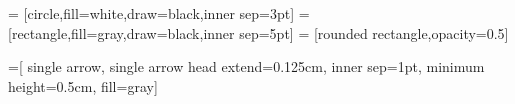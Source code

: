 \usetikzlibrary{shapes}
\usetikzlibrary{arrows}
\usetikzlibrary{fit}
\usetikzlibrary{positioning}
\usetikzlibrary{shadows}
\usetikzlibrary{calc}
\usetikzlibrary{backgrounds}

=
  [circle,fill=white,draw=black,inner sep=3pt]
=
  [rectangle,fill=gray,draw=black,inner sep=5pt]
=
  [rounded rectangle,opacity=0.5]

=[
  single arrow,
  single arrow head extend=0.125cm,
  inner sep=1pt,
  minimum height=0.5cm,
  fill=gray]
